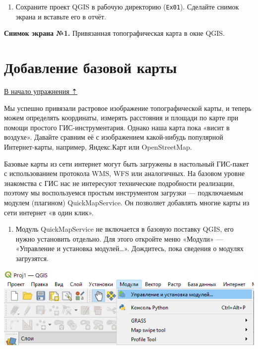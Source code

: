 \documentclass[
  12pt,
]{book}
\providecommand{\tightlist}{%
  \setlength{\itemsep}{0pt}\setlength{\parskip}{0pt}}
\begin{document}
\begin{enumerate}
\def\labelenumi{\arabic{enumi}.}
\setcounter{enumi}{20}
\tightlist
\item
  Сохраните проект QGIS в рабочую директорию (\texttt{Ex01}). Сделайте снимок экрана и вставьте его в отчёт.
\end{enumerate}

\textbf{Снимок экрана №1.} Привязанная топографическая карта в окне QGIS.

\hypertarget{raster-reference-basemap}{%
\section{Добавление базовой карты}\label{raster-reference-basemap}}

\protect\hyperlink{raster-reference}{В начало упражнения ⇡}

Мы успешно привязали растровое изображение топографической карты, и теперь можем определять координаты, измерять расстояния и площади по карте при помощи простого ГИС-инструментария. Однако наша карта пока «висит в воздухе». Давайте сравним её с изображением какой-нибудь популярной Интернет-карты, например, Яндекс.Карт или OpenStreetMap.

Базовые карты из сети интернет могут быть загружены в настольный ГИС-пакет с использованием протокола WMS, WFS или аналогичных. На базовом уровне знакомства с ГИС нас не интересуют технические подробности реализации, поэтому мы воспользуемся простым инструментом загрузки --- подключаемым модулем (плагином) QuickMapService. Он позволяет добавлять многие карты из сети интернет «в один клик».

\begin{enumerate}
\def\labelenumi{\arabic{enumi}.}
\tightlist
\item
  Модуль QuickMapService не включается в базовую поставку QGIS, его нужно установить отдельно. Для этого откройте меню «Модули» --- «Управление и установка модулей\ldots». Дождитесь, пока сведения о модулях загрузятся.
\end{enumerate}

\includegraphics{images/Ex05_Reference/modules01.png}
\end{document}

